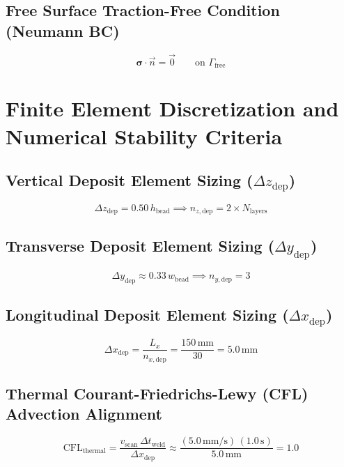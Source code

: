 \documentclass[10pt,a4paper]{article}
\begin{document}
\subsection*{Free Surface Traction-Free Condition (Neumann BC)}
\[
\boldsymbol{\sigma} \cdot \vec{n} = \vec{0} \qquad \text{on } \Gamma_{\mathrm{free}}
\]

\clearpage
\section{Finite Element Discretization and Numerical Stability Criteria}

\subsection*{Vertical Deposit Element Sizing ($\Delta z_{\mathrm{dep}}$)}
\[
\Delta z_{\mathrm{dep}} = 0.50\,h_{\mathrm{bead}} \implies n_{z,\mathrm{dep}} = 2 \times N_{\mathrm{layers}}
\]

\subsection*{Transverse Deposit Element Sizing ($\Delta y_{\mathrm{dep}}$)}
\[
\Delta y_{\mathrm{dep}} \approx 0.33\,w_{\mathrm{bead}} \implies n_{y,\mathrm{dep}} = 3
\]

\subsection*{Longitudinal Deposit Element Sizing ($\Delta x_{\mathrm{dep}}$)}
\[
\Delta x_{\mathrm{dep}} = \frac{L_x}{n_{x,\mathrm{dep}}} = \frac{150\,\mathrm{mm}}{30} = 5.0\,\mathrm{mm}
\]

\subsection*{Thermal Courant-Friedrichs-Lewy (CFL) Advection Alignment}
\[
\mathrm{CFL}_{\mathrm{thermal}} = \frac{v_{\mathrm{scan}}\,\Delta t_{\mathrm{weld}}}{\Delta x_{\mathrm{dep}}} \approx \frac{(5.0\,\mathrm{mm/s})\,(1.0\,\mathrm{s})}{5.0\,\mathrm{mm}} = 1.0
\]
\end{document}

